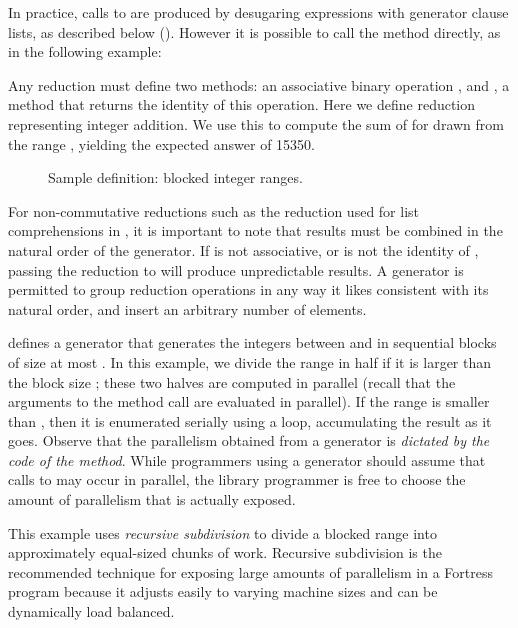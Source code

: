 In practice, calls to  are produced by desugaring
expressions with generator clause lists, as described below
().  However it is possible to call the
 method directly, as in the following example:


Any reduction must define two methods: an associative binary operation
, and , a method that returns the identity of
this operation.  Here we define reduction  representing integer
addition.  We use this to compute the sum of  for 
drawn from the range ,
yielding the expected answer of 15350.

\begin{figure}

\caption{Sample  definition: blocked integer ranges.}
\end{figure}

For non-commutative reductions such as the  reduction used for
list comprehensions in , it is important to
note that results must be combined in the natural order of the
generator.  If  is not associative, or  is not
the identity of , passing the reduction to 
will produce unpredictable results.  A generator is permitted to group
reduction operations in any way it likes consistent with its natural
order, and insert an arbitrary number of  elements.

 defines a generator that generates the integers
between  and  in sequential blocks of size at most
.  In this example, we divide the range in half if it is larger
than the block size ; these two halves are computed in parallel
(recall that the arguments to the method call
 are evaluated in parallel).  If the
range is smaller than , then it is enumerated serially using a
 loop, accumulating the result  as it goes.  Observe
that the parallelism obtained from a generator is \emph{dictated by
  the code of the  method}.  While programmers using a
generator should assume that calls to  may occur in
parallel, the library programmer is free to choose the amount of
parallelism that is actually exposed.

This example uses \emph{recursive subdivision} to divide a blocked
range into approximately equal-sized chunks of work.  Recursive
subdivision is the recommended technique for exposing large amounts of
parallelism in a Fortress program because it adjusts easily to varying
machine sizes and can be dynamically load balanced.

